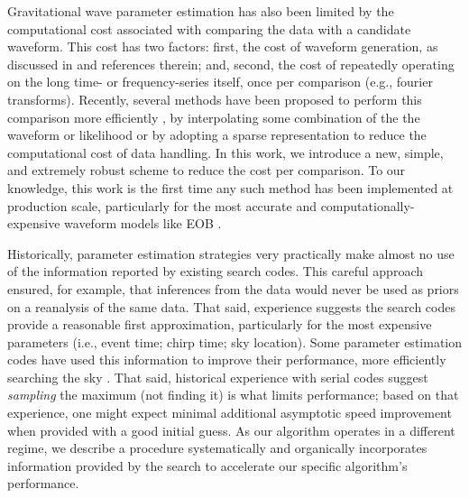 Gravitational wave parameter estimation has also been limited by the computational cost associated with comparing the
data with a candidate waveform.  This cost has two factors: first, the cost of waveform generation, as discussed in
\cite{gwastro-mergers-PE-ReducedOrder-2013,2013PhRvD..87l2002S,2013PhRvD..87d4008C,gwastro-mergers-IMRPhenomP,gwastro-SpinTaylorF2-2013} and references therein; and, second,
the cost of repeatedly operating on the long time- or frequency-series itself, once per comparison (e.g., fourier
transforms).   
%
Recently, several methods have been proposed to perform this comparison more efficiently
\cite{gwastro-mergers-PE-ReducedOrder-2013,2013PhRvD..87l2002S,2013PhRvD..87d4008C,gw-astro-ReducedOrderQuadraturePE-TiglioEtAl2014}, by interpolating some combination
of the the waveform or likelihood or by adopting a sparse representation to reduce the computational cost of data
handling.  
%
In this work, we introduce a new, simple, and extremely robust scheme to reduce the cost per comparison.  
%
To our knowledge, this work is the first time any such method has been implemented at production scale, particularly for
the most accurate and computationally-expensive waveform models like EOB
\cite{gw-astro-EOBspin-Tarrachini2012,gw-astro-EOBNR-Calibrated-2009}.  


Historically, parameter estimation strategies very practically make almost no use of the information reported by
existing search codes.  This careful approach ensured, for example, that inferences from the data would never be used as priors on a
reanalysis of the same data.  
%
That said, experience suggests the search codes provide a reasonable first approximation, 
particularly for the most expensive parameters (i.e., event time; chirp time; sky location).  
%
Some parameter estimation codes have used this information to improve their performance, more efficiently searching the
sky .  
That said, historical experience with serial codes suggest \emph{sampling} the maximum (not finding it) is what limits
performance; based on that experience, one might expect minimal additional asymptotic speed improvement when provided
with a good initial guess.
%
As our algorithm operates in a different regime,  we describe a procedure systematically and organically incorporates information provided
by the search to accelerate our specific algorithm's performance.  



